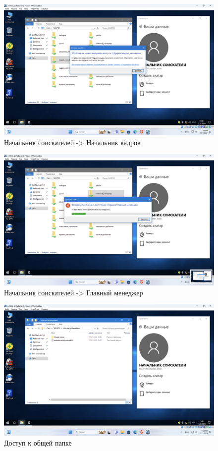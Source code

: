 \begin{figure}[H]
  \centering
  \includegraphics[width=1\textwidth]{pict/prac/38}
  \caption{Начальник соискателей -> Начальник кадров}
  \label{fig:37}
\end{figure}


\begin{figure}[H]
  \centering
  \includegraphics[width=1\textwidth]{pict/prac/40}
  \caption{Начальник соискателей -> Главный менеджер}
  \label{fig:39}
\end{figure}


\begin{figure}[H]
  \centering
  \includegraphics[width=1\textwidth]{pict/prac/42}
  \caption{Доступ к общей папке}
  \label{fig:41}
\end{figure}

